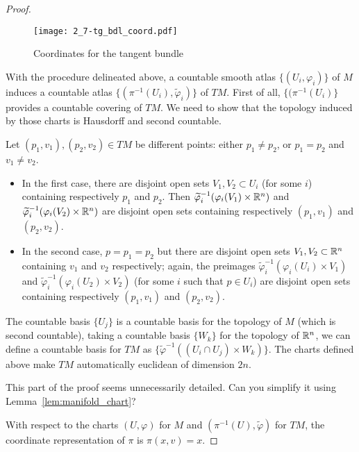 \begin{proof}
  \begin{figure*}[htp]
    \texttt{[image: 2\_7-tg\_bdl\_coord.pdf]}
    \caption{Coordinates for the tangent bundle}
  \end{figure*}

  With the procedure delineated above, a countable smooth atlas $\{(U_i, \varphi_i)\}$ of $M$ induces a countable atlas $\{(\pi^{-1}(U_i), \widetilde\varphi_i)\}$ of $TM$.
  First of all, $\{(\pi^{-1}(U_i)\}$ provides a countable covering of $TM$.
  We need to show that the topology induced by those charts is Hausdorff and second countable.

  Let $(p_1, v_1), (p_2, v_2) \in TM$ be different points: either $p_1\neq p_2$, or $p_1 = p_2$ and $v_1 \neq v_2$.
  \begin{itemize}
    \item In the first case, there are disjoint open sets $V_1, V_2 \subset U_i$ (for some $i$) containing respectively $p_1$ and $p_2$.
          Then $\widetilde\varphi_i^{-1}(\varphi_i(V_1)\times\mathbb{R}^n)$ and $\widetilde\varphi_i^{-1}(\varphi_i(V_2)\times\mathbb{R}^n)$ are disjoint open sets containing respectively $(p_1, v_1)$ and $(p_2, v_2)$.
    \item In the second case, $p=p_1=p_2$ but there are disjoint open sets $V_1,V_2\subset \mathbb{R}^n$ containing $v_1$ and $v_2$ respectively;
          again, the preimages $\widetilde\varphi_i^{-1}(\varphi_i(U_i)\times V_1)$ and $\widetilde\varphi_i^{-1}(\varphi_i(U_2)\times V_2)$ (for some $i$ such that $p\in U_i$) are disjoint open sets containing respectively $(p_1, v_1)$ and $(p_2, v_2)$.
  \end{itemize}

  The countable basis $\{U_j\}$ is a countable basis for the topology of $M$ (which is second countable), taking a countable basis $\{W_k\}$ for the topology of $\mathbb{R}^n$, we can define a countable basis for $TM$ as $\{\widetilde\varphi^{-1}((U_i\cap U_j)\times W_k)\}$.
  The charts defined above make $TM$ automatically euclidean of dimension $2n$.

  \begin{exercise}
    This part of the proof seems unnecessarily detailed.
    Can you simplify it using Lemma~\ref{lem:manifold_chart}?
  \end{exercise}

   With respect to the charts $(U,\varphi)$ for $M$ and $(\pi^{-1}(U), \widetilde\varphi)$ for $TM$, the coordinate representation of $\pi$ is $\pi(x,v) = x$.
\end{proof}

